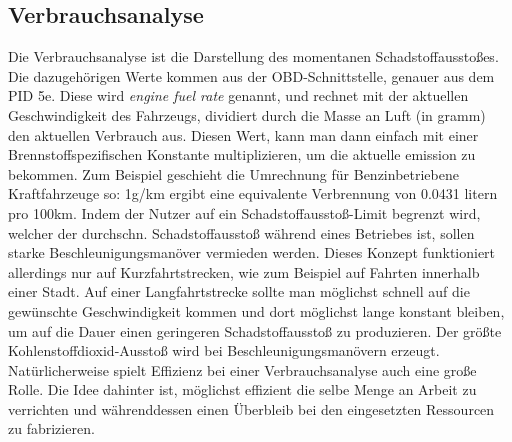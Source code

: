 \subsection{Verbrauchsanalyse}

Die Verbrauchsanalyse ist die Darstellung des momentanen Schadstoffausstoßes.
Die dazugehörigen Werte kommen aus der OBD-Schnittstelle, genauer aus dem PID 5e.
Diese wird \textit{engine fuel rate} genannt, und rechnet mit der 
aktuellen Geschwindigkeit des Fahrzeugs, dividiert durch die Masse an Luft (in gramm)
den aktuellen Verbrauch aus. Diesen Wert, kann man dann einfach mit einer Brennstoffspezifischen
Konstante multiplizieren, um die aktuelle  emission zu bekommen.
Zum Beispiel geschieht die Umrechnung für Benzinbetriebene Kraftfahrzeuge so:
1g/km  ergibt eine equivalente Verbrennung von 0.0431 litern pro 100km. 
Indem der Nutzer auf ein Schadstoffausstoß-Limit begrenzt wird, welcher der durchschn.
Schadstoffausstoß während eines Betriebes ist, sollen starke Beschleunigungsmanöver 
vermieden werden. Dieses Konzept funktioniert allerdings nur auf Kurzfahrtstrecken,
wie zum Beispiel auf Fahrten innerhalb einer Stadt.
Auf einer Langfahrtstrecke sollte man möglichst schnell auf die gewünschte Geschwindigkeit kommen
und dort möglichst lange konstant bleiben, um auf die Dauer einen geringeren Schadstoffausstoß zu produzieren.
Der größte Kohlenstoffdioxid-Ausstoß wird bei Beschleunigungsmanövern erzeugt.
Natürlicherweise spielt Effizienz bei einer Verbrauchsanalyse auch eine große Rolle.
Die Idee dahinter ist, möglichst effizient die selbe Menge an Arbeit zu verrichten und währenddessen einen Überbleib
bei den eingesetzten Ressourcen zu fabrizieren. 

